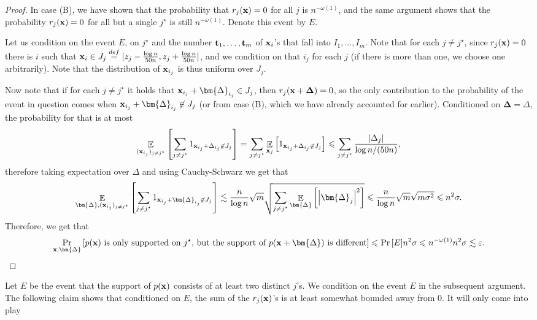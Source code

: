 \documentclass[10pt,a4paper]{article}
\newcommand\card[1]{\left| {#1} \right|}
\newcommand\Prob[2]{{\Pr_{#1}\left[ {#2} \right]}}
\newcommand\Expect[2]{{\mathop{\mathbb{E}}_{#1}\left[ {#2} \right]}}
\newcommand\defeq{\stackrel{def}{=}}
\newcommand\eps{\varepsilon}
\renewcommand\leq{\leqslant}
\newcommand{\De}{\Delta}
\def\ll{\lesssim}
\begin{document}
\begin{proof}
    In case (B), we have shown that the probability that $r_j({\bf x}) = 0$ for all $j$ is $n^{-\omega(1)}$, and the same argument
    shows that the probability $r_j({\bf x}) = 0$ for all but a single $j^{\star}$ is still $n^{-\omega(1)}$. Denote this event by $E$.

    Let us condition on the event $E$, on $j^{\star}$ and the number ${\bf t}_1,\ldots,{\bf t}_m$ of ${\bf x}_i$'s that fall into $I_1,\ldots,I_m$.
    Note that for each $j\neq j^{\star}$, since $r_j({\bf x}) = 0$ there is $i$ such that ${\bf x}_i\in J_j \defeq [z_{j} - \frac{\log n}{50 n}, z_{j} + \frac{\log n}{50 n}]$,
    and we condition on that $i_j$ for each $j$ (if there is more than one, we choose one arbitrarily). Note that the distribution of ${\bf x}_{i_j}$
    is thus uniform over $J_j$.

    Now note that if for each $j\neq j^{\star}$ it holds that ${\bf x}_{i_j} + \bm{\De}_{i_j}\in J_j$, then $r_j({\bf x}+{\bf \De}) = 0$, so the only contribution to
    the probability of the event in question comes when ${\bf x}_{i_j} + \bm{\De}_{i_j}\not\in J_j$ (or from case (B), which we have already accounted for earlier).
    Conditioned on $\bm{\De} = \De$, the probability for that is
    at most
    \[
    \Expect{({\bf x}_{i_j})_{j\neq j^{\star}}}{\sum\limits_{j\neq j^{\star}}1_{{\bf x}_{i_j} + \De_{i_j}\not\in J_j}}
    = \sum\limits_{j\neq j^{\star}}\Expect{{\bf x}_j}{1_{{\bf x}_{i_j} + \De_{i_j}\not\in J_j}}
    \leq \sum\limits_{j\neq j^{\star}}\frac{\card{\De_j}}{\log n/(50n)},
    \]
    therefore taking expectation over $\De$ and using Cauchy-Schwarz we get that
    \[
    \Expect{\bm{\De},({\bf x}_{i_j})_{j\neq j^{\star}}}{\sum\limits_{j\neq j^{\star}}1_{{\bf x}_{i_j} + \bm{\De}_{i_j}\not\in J_j}}
    \ll
    \frac{n}{\log n}\sqrt{m}\sqrt{\sum\limits_{j\neq j^{\star}}
    \Expect{\bm{\De}}{\card{\bm{\De}_j}^2}}
    \leq \frac{n}{\log n}\sqrt{m}\sqrt{m\sigma^2} \leq n^2\sigma.
    \]
    Therefore, we get that
    \[
    \Prob{{\bf x},\bm{\De}}{\text{$p({\bf x})$ is only supported on $j^{\star}$,
        but the support of $p({\bf x}+\bm{\De})$ is different}}
        \leq \Prob{}{E}n^2\sigma
        \leq n^{-\omega(1)} n^2 \sigma
        \ll \eps.\qedhere
    \]
\end{proof}
Let $E$ be the event that the support of $p({\bf x})$ consists of at least two distinct $j$'s. We condition on the event $E$ in the subsequent argument.
The following claim shows that conditioned on $E$, the sum of the $r_j({\bf x})$'s is at least somewhat bounded away from $0$. It will only come into play
\end{document}
